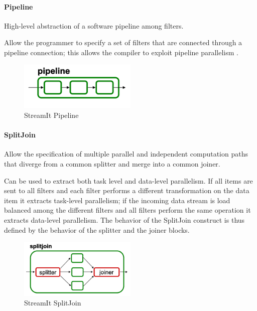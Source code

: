 \documentclass[../main.tex]{subfiles}
\begin{document}
\paragraph{Pipeline}
High-level abstraction of a software pipeline among filters.

Allow the programmer to specify a set of filters that are connected through a pipeline connection; this allows the compiler to exploit pipeline parallelism \cite{streamit3}.

\begin{figure}[h!]
  \includegraphics[width=0.5\textwidth]{images/StreamItPipeline.png}
  \centering
  \caption{StreamIt Pipeline}
  \label{fig:pipeline}
\end{figure}

\paragraph{SplitJoin}
Allow the specification of multiple parallel and independent computation paths that diverge from a common splitter and merge into a common joiner.

\newpage

Can be used to extract both task level and data-level parallelism. 
If all items are sent to all filters and each filter performs a different transformation on the data item it extracts task-level parallelism; if the incoming data stream is load balanced among the different filters and all filters perform the same operation it extracts data-level parallelism. The behavior of the SplitJoin construct is thus defined by the behavior of the splitter and the joiner blocks.

\begin{figure}[h!]
  \includegraphics[width=0.5\textwidth]{images/StreamItSplitJoin.png}
  \centering
  \caption{StreamIt SplitJoin}
  \label{fig:splitjoin}
\end{figure}
\end{document}
